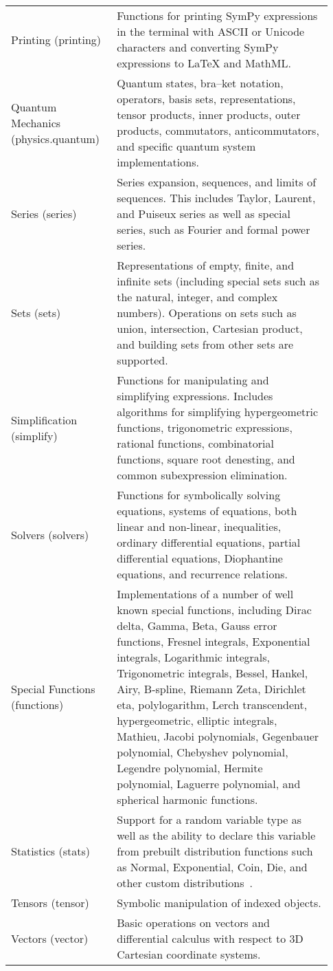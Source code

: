 \begin{longtable}[htbc]{p{0.30\linewidth}p{0.63\linewidth}}
Printing (printing) & Functions for printing SymPy expressions in the terminal with ASCII
or Unicode characters and converting SymPy expressions to \LaTeX{} and
MathML.\\

Quantum Mechanics (physics.quantum) & Quantum states, bra--ket notation, operators, basis sets,
representations, tensor products, inner products, outer products, commutators,
anticommutators, and specific quantum system implementations.\\

Series (series) & Series expansion, sequences, and limits of sequences.
This includes Taylor, Laurent, and Puiseux series as well as special series, such
as Fourier and formal power series.\\

Sets (sets) & Representations of empty, finite, and infinite sets (including
special sets such as the natural, integer, and complex numbers). Operations
on sets such as union, intersection, Cartesian product, and building sets from
other sets are supported.\\

Simplification (simplify) & Functions for manipulating and simplifying expressions.
Includes algorithms for simplifying hypergeometric functions, trigonometric
expressions, rational functions, combinatorial functions, square root
denesting, and common subexpression elimination.\\

Solvers (solvers) & Functions for symbolically solving equations, systems
of equations, both linear and non-linear, inequalities, ordinary differential
equations, partial differential equations, Diophantine equations, and
recurrence relations.\\

Special Functions (functions) & Implementations of a number of well known special functions,
including Dirac delta, Gamma, Beta, Gauss error functions, Fresnel integrals,
Exponential integrals, Logarithmic integrals, Trigonometric integrals, Bessel,
Hankel, Airy, B-spline, Riemann Zeta, Dirichlet eta, polylogarithm, Lerch
transcendent, hypergeometric, elliptic integrals, Mathieu, Jacobi polynomials,
Gegenbauer polynomial, Chebyshev polynomial, Legendre polynomial, Hermite
polynomial, Laguerre polynomial, and
spherical harmonic functions.\\

Statistics (stats) & Support for a random variable type as well as the ability to
declare this variable from prebuilt distribution functions such as
Normal, Exponential, Coin, Die, and other custom distributions~\cite{StatsMRocklin}.\\

Tensors (tensor) & Symbolic manipulation of indexed objects.\\

Vectors (vector) & Basic operations on vectors and differential calculus with respect
to 3D Cartesian coordinate systems.\\
\bottomrule

\end{longtable}

